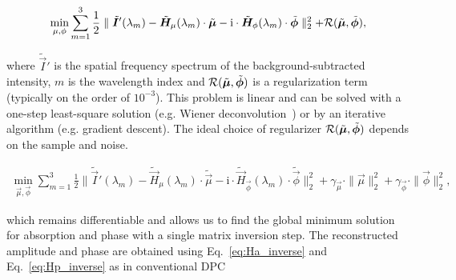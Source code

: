\begin{equation}\label{eq:objectivefunction}
\begin{split}
\min_{\mu,\phi} \sum_{m=1}^{3}\frac{1}{2} \parallel\tilde{\bm{I}}'(\lambda_m) - \tilde{\bm{H}}_{\mu}(\lambda_m)\cdot \tilde{\bm{\mu}} - \mathrm{i}\cdot\tilde{\bm{H}}_{\phi}(\lambda_m)\cdot \tilde{\bm{\phi}} \parallel_2^2 + \mathcal{R}(\tilde{\bm{\mu}},\tilde{\bm{\phi}}),
\end{split}
\end{equation}

\noindent where $\tilde{\vec{I}}'$ is the spatial frequency spectrum of the background-subtracted intensity, $m$ is the wavelength index and $\mathcal{R}(\tilde{\bm{\mu}},\tilde{\bm{\phi}})$ is a regularization term (typically on the order of $10^{-3}$). This problem is linear and can be solved with a one-step least-square solution (e.g. Wiener deconvolution~\cite{HayesDSP}) or by an iterative algorithm (e.g. gradient descent). The ideal choice of regularizer $\mathcal{R}(\tilde{\bm{\mu}}, \tilde{\bm{\phi}})$ depends on the sample and noise. %

\begin{equation}\label{eq:objectivefunction2}
\begin{split}
\min_{\vec{\mu},\vec{\phi}} \sum_{m=1}^{3} \frac{1}{2}  \parallel\tilde{\vec{I}}'(\lambda_m) - \tilde{\vec{H}}_{\mu}(\lambda_m)\cdot \tilde{\vec{\mu}} - \mathrm{i}\cdot\tilde{\vec{H}}_{\vec{\phi}}(\lambda_m)\cdot \tilde{\vec{\phi}} \parallel_2^2 + \gamma_{\vec{\mu}}\cdot \parallel \vec{\mu} \parallel^2_2 + \gamma_{\vec{\phi}}\cdot \parallel \vec{\phi}\parallel^2_2,
\end{split}
\end{equation}

\noindent which remains differentiable and allows us to find the global minimum solution for absorption and phase with a single matrix inversion step. The reconstructed amplitude and phase are obtained using Eq.~\ref{eq:Ha_inverse} and Eq.~\ref{eq:Hp_inverse} as in conventional DPC

